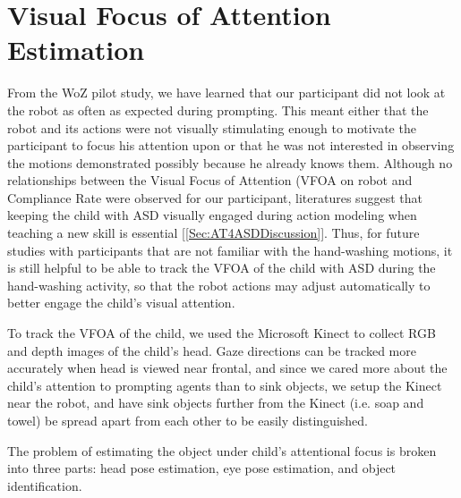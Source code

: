 \chapter{Visual Focus of Attention Estimation}
From the WoZ pilot study, we have learned that our participant did not look at the robot as often as expected during prompting.  This meant either that the robot and its actions were not visually stimulating enough to motivate the participant to focus his attention upon or that he was not interested in observing the motions demonstrated possibly because he already knows them.  Although no relationships between the Visual Focus of Attention (VFOA on robot and Compliance Rate were observed for our participant, literatures suggest that keeping the child with ASD visually engaged during action modeling when teaching a new skill is essential [\ref{Sec:AT4ASDDiscussion}].  Thus, for future studies with participants that are not familiar with the hand-washing motions, it is still helpful to be able to track the VFOA of the child with ASD during the hand-washing activity, so that the robot actions may adjust automatically to better engage the child's visual attention.

To track the VFOA of the child, we used the Microsoft Kinect to collect RGB and depth images of the child's head.  Gaze directions can be tracked more accurately when head is viewed near frontal, and since we cared more about the child's attention to prompting agents than to sink objects, we setup the Kinect near the robot, and have sink objects further from the Kinect (i.e. soap and towel) be spread apart from each other to be easily distinguished.

The problem of estimating the object under child's attentional focus is broken into three parts: head pose estimation, eye pose estimation, and object identification.


%
%	
%	








